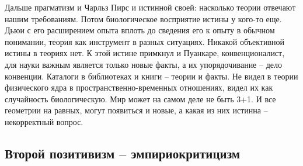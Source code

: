 \documentclass[a4paper, 12pt]{article}
\begin{document}
Дальше прагматизм и Чарльз Пирс и истинной своей: насколько теории 
отвечают нашим требованиям. Потом биологическое восприятие истины 
у кого-то еще. Дьюи с его расширением опыта вплоть до сведения его 
к опыту в обычном понимании, теория как инструмент в разных ситуациях. 
Никакой объективной истины в теориях нет. К этой истине примкнул 
и Пуанкаре, конвенционалист, для науки важным является только новые 
факты, а их упорядочивание -- дело конвенции. Каталоги в библиотеках 
и книги -- теории и факты. Не видел в теории физического ядра 
в пространственно-временных отношениях, видел их как случайность 
биологическую. Мир может на самом деле не быть 3+1. И все геометрии на 
равных, могут появиться и новые, а какая из них истинна -- некорректный 
вопрос.


\subsection{Второй позитивизм -- эмпириокритицизм}
\end{document}
